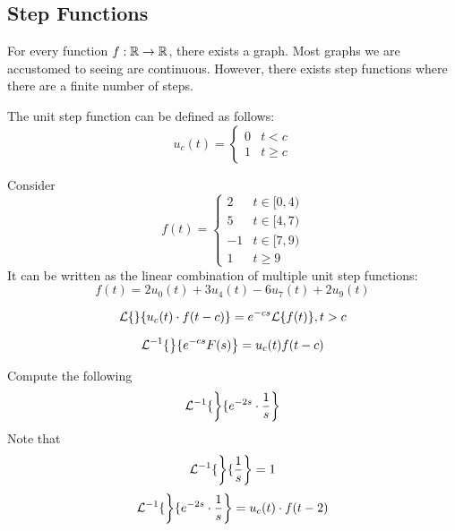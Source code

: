 \documentclass[diffeq.tex]{subfiles}
\begin{document}
    \subsection{Step Functions} %
    For every function $f: \mathbb{R} \to \mathbb{R}$, there exists a graph. Most graphs we are accustomed to seeing are continuous. However, there exists step functions where there are a finite number of steps.
    \np
    \begin{definition}
        The unit step function can be defined as follows:
        \begin{equation}
            u_{c}(t) = \begin{cases}
                0 & t < c\\
                1 & t \geq c
            \end{cases}
        \end{equation}
    \end{definition}
    \begin{example}
        Consider
        \begin{equation}
            f(t) = \begin{cases}
                2 & t \in [0, 4) \\
                5 & t \in [4, 7) \\
                -1 & t \in [7, 9) \\
                1 & t \geq 9
            \end{cases}
        \end{equation}
        It can be written as the linear combination of multiple unit step functions:
        \begin{equation}
            f(t) = 2u_{0}(t) + 3u_{4}(t) - 6u_{7}(t) + 2u_{9}(t)
        \end{equation}
    \end{example}
    \begin{theorem}
        \begin{equation}
            \mathcal{L}\{\left\}\{u_{c}(t)\cdot f(t-c)\right\} = e^{-cs}\mathcal{L}\{f(t)\}, t > c
        \end{equation}
    \end{theorem}
    \begin{corollary}
        \begin{equation}
            \mathcal{L}^{-1}\{\left\}\{e^{-cs}F(s)\right\} = u_{c}(t)f(t-c)
        \end{equation}
    \end{corollary}
    \begin{example}
        Compute the following
        \begin{equation}
            \mathcal{L}^{-1}\{\left\}\{e^{-2s}\cdot \frac{1}{s}\right\}
        \end{equation}
        Note that
        \begin{equation}
            \mathcal{L}^{-1}\{\left\}\{\frac{1}{s}\right\} = 1
        \end{equation}
        \begin{equation}
            \mathcal{L}^{-1}\{\left\}\{e^{-2s}\cdot \frac{1}{s}\right\} = u_{c}(t)\cdot f(t-2)
        \end{equation}
    \end{example}
\end{document}

